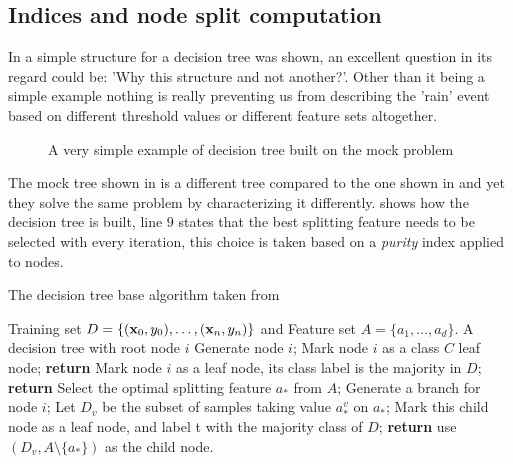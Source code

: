 \subsection{Indices and node split computation}
In  a simple structure for a decision tree was shown, an excellent question in
its regard could be: 'Why this structure and not another?'. Other than it being a simple example
nothing is really preventing us from describing the 'rain' event based on different threshold values
or different feature sets altogether.
\begin{figure}
	\centering
	\caption{A very simple example of decision tree built on the mock problem}
	\label{fig:simple-dt-alt}
\end{figure}
The mock tree shown in  is a different tree compared to the one shown in
 and yet they solve the same problem by characterizing it differently.
 shows how the decision tree is built, line $9$ states that the best
splitting feature needs to be selected with every iteration, this choice is taken based on a
\emph{purity} index applied to nodes.

\begin{algorithm}
	\caption{The decision tree base algorithm taken from
		\cite{ZhouZhi-Hua2021ML}}\label{algo:decision-tree}
	\begin{algorithmic}[1]
		\Require Training set $D = \{(\mathbf{x}_0, y_0), \ldots, (\mathbf{x}_n, y_n)\}$ and Feature set $A = \{a_1, \ldots,
			a_d\}$.
		\Ensure A decision tree with root node $i$
		\State Generate node $i$;
		\State Mark node $i$ as a class $C$ leaf node; \textbf{return}
		\EndIf
		\State Mark node $i$ as a leaf node, its class label is
		the majority in $D$; \textbf{return}
		\EndIf
		\State Select the optimal splitting feature $a_*$ from $A$;
		\State Generate a branch for node $i$; Let $D_v$ be the
		subset of samples taking value $a_*^v$ on $a_*$;
		\State Mark this child node as a leaf node, and
		label t with the majority class of $D$;
		\textbf{return}
		\Else
		\State use $(D_v, A \setminus \{a_*\})$ as the child node.
		\EndIf
		\EndFor
		\EndFunction
	\end{algorithmic}
\end{algorithm}


